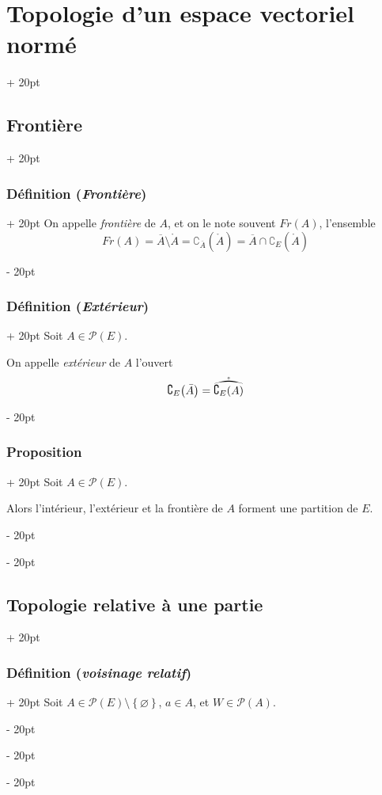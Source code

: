 \documentclass[a4paper, 12pt, twoside]{article}
\newcommand{\cj}[1]{\overline{#1}} %
\newcommand{\lr}[1]{\left( #1 \right)}
\newcommand{\set}[1]{\left\{ #1 \right\}}
\newcommand{\ind}[1][20pt]{\advance\leftskip + #1}
\newcommand{\deind}[1][20pt]{\advance\leftskip - #1}
\newenvironment{indt}[2][20pt]{#2 \par \ind[#1]}{\par \deind} %
\begin{document}
\begin{indt}{\section{Topologie d'un espace vectoriel normé}}
\begin{indt}{\subsection{Frontière}}
\begin{indt}{\subsubsection{Définition (\textit{Frontière})}}
                On appelle \emph{frontière} de $A$, et on le note souvent $Fr(A)$, l'ensemble
                \[
                    Fr(A) = \cj A \setminus \mathring A
                    = \complement_{\cj A}\!\lr{\mathring A}
                    = \cj A \cap \complement_E\!\lr{\mathring A}
                \]
            \end{indt}

            \vspace{12pt}
            
            \begin{indt}{\subsubsection{Définition (\textit{Extérieur})}}
                Soit $A \in \mathcal P(E)$.

                On appelle \emph{extérieur} de $A$ l'ouvert
                \[
                    \complement_E\!\lr{\bar A} = \widering{\complement_E(A)}
                \]
            \end{indt}

            \vspace{12pt}
            
            \begin{indt}{\subsubsection{Proposition}}
                Soit $A \in \mathcal P(E)$.

                Alors l'intérieur, l'extérieur et la frontière de $A$ forment une partition de $E$.
            \end{indt}
        \end{indt}

        \vspace{12pt}
        
        \begin{indt}{\subsection{Topologie relative à une partie}}
            \begin{indt}{\subsubsection{Définition (\textit{voisinage relatif})}}
                Soit $A \in \mathcal P(E) \setminus \set \varnothing$, $a \in A$, et $W \in \mathcal P(A)$.


\end{indt}
\end{indt}
\end{indt}
\end{document}
